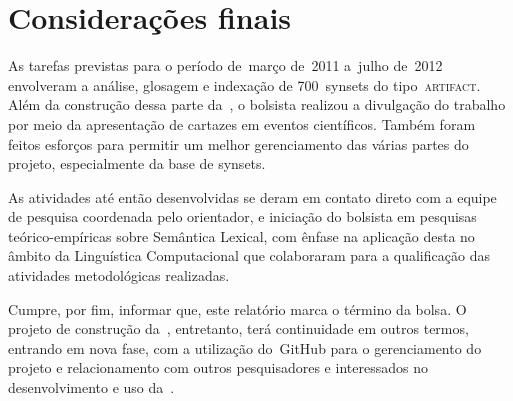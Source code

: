 \chapter{Considerações finais}

% 
% 

As tarefas previstas para o período de~março de~2011 a~julho de~2012 envolveram
a análise, glosagem e indexação de 700~synsets do tipo~\textsc{artifact}. Além
da construção dessa parte da~\wnbr, o bolsista realizou a divulgação do
trabalho por meio da apresentação de cartazes em eventos científicos. Também
foram feitos esforços para permitir um melhor gerenciamento das várias partes
do projeto, especialmente da base de synsets.

As atividades até então desenvolvidas se deram em contato direto com a equipe
de pesquisa coordenada pelo orientador, e iniciação do bolsista em pesquisas
teórico-empíricas sobre Semântica Lexical, com ênfase na aplicação desta no
âmbito da Linguística Computacional que colaboraram para a qualificação das
atividades metodológicas realizadas.

Cumpre, por fim, informar que, este relatório marca o término da bolsa. O
projeto de construção da~\wnbr, entretanto, terá continuidade em outros
termos, entrando em nova fase, com a utilização do~GitHub para o gerenciamento
do projeto e relacionamento com outros pesquisadores e interessados no
  desenvolvimento e uso da~\wnbr.
